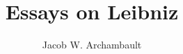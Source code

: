 \documentclass[a4paper,12pt]{book}
\begin{document}
\author{Jacob W. Archambault}
\title{Essays on Leibniz}

\frontmatter
\maketitle
\tableofcontents

\mainmatter


\backmatter
\printbibliography
\end{document}
